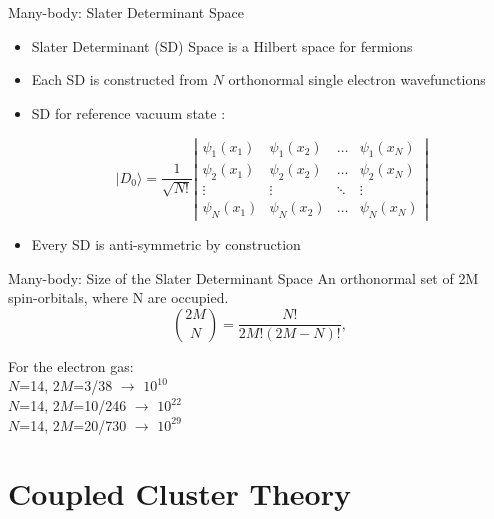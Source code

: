\documentclass{beamer}
\begin{document}
  \begin{frame}{Many-body: Slater Determinant Space}
  \begin{itemize}
  	\item Slater Determinant (SD) Space is a Hilbert space for fermions 
  	\item Each SD is constructed from $N$ orthonormal single electron
  	wavefunctions
  	
  	\item SD for reference vacuum state :
 
  \begin{equation*}
  |D_0\rangle = \frac{1}{\sqrt{N!}}
  \left| \begin{array}{ccccc} \psi_{1}(x_1)& \psi_{1}(x_2)& \dots & \psi_{1}(x_N)\\
  \psi_{2}(x_1)&\psi_{2}(x_2)& \dots  & \psi_{2}(x_N)\\  
  \vdots & \vdots & \ddots  & \vdots \\
  \psi_{N}(x_1)&\psi_{N}(x_2)& \dots  & \psi_{N}(x_N)\end{array} \right| 
  \end{equation*}
  \item Every  SD is anti-symmetric by construction
   \end{itemize}
  \end{frame}

 \begin{frame}{Many-body: Size of the Slater Determinant Space}
An orthonormal set of 2M spin-orbitals, where N are occupied.
\begin{equation*}
\binom {2M}{N} = \frac{N!}{2M!(2M-N)!}, 
\end{equation*}

For the electron gas:\\
$N$=14, $2M$=3/38	$\rightarrow$ $10^{10}$\\
$N$=14, $2M$=10/246	$\rightarrow$ $10^{22}$\\
$N$=14, $2M$=20/730	$\rightarrow$ $10^{29}$
\end{frame}



\section{Coupled Cluster Theory}
\end{document}
